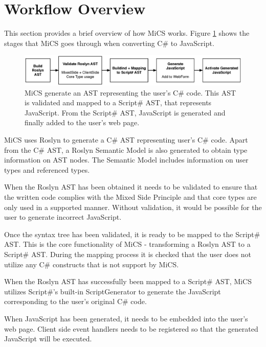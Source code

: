 \section{Workflow Overview} %
\label{sec:workflow_overview}

This section provides a brief overview of how MiCS works. Figure \ref{fig:mics_internal_workflow} shows the stages that MiCS goes through when converting C\# to JavaScript.

\begin{figure}[H]
	\begin{center}
		\centerline{\includegraphics[width=18cm]{resources/images/internalworkflow.eps}}
	\end{center}
	\caption{MiCS generate an AST representing the user's C\# code. This AST is validated and mapped to a Script\# AST, that represents JavaScript. From the Script\# AST, JavaScript is generated and finally added to the user's web page.}
	\label{fig:mics_internal_workflow}
\end{figure}

MiCS uses Roslyn to generate a C\# AST representing user's  C\# code. Apart from the C\# AST, a Roslyn Semantic Model is also generated to obtain type information on AST nodes. The Semantic Model includes information on user types and referenced types.

When the Roslyn AST has been obtained it needs to be validated to ensure that the written code complies with the Mixed Side Principle and that core types are only used in a supported manner. Without validation, it would be possible for the user to generate incorrect JavaScript.

Once the syntax tree has been validated, it is ready to be mapped to the Script\# AST. This is the core functionality of MiCS - transforming a Roslyn AST to a Script\# AST. During the mapping process it is checked that the user does not utilize any C\# constructs that is not support by MiCS. 

When the Roslyn AST has successfully been mapped to a Script\# AST, MiCS utilizes Script\#’s built-in ScriptGenerator to generate the JavaScript corresponding to the user’s original C\# code. 

When JavaScript has been generated, it needs to be embedded into the user’s web page. Client side event handlers needs to be registered so that the generated JavaScript will be executed.


